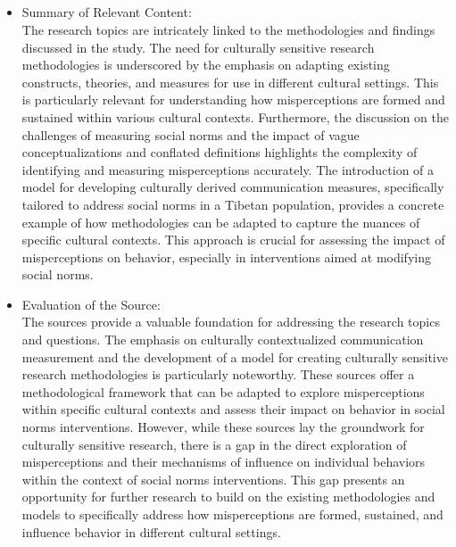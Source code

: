 \documentclass{article}
\begin{document}
\subsection{}
\begin{itemize}
    \item Summary of Relevant Content:\\
The research topics are intricately linked to the methodologies and findings discussed in the study. The need for culturally sensitive research methodologies is underscored by the emphasis on adapting existing constructs, theories, and measures for use in different cultural settings. This is particularly relevant for understanding how misperceptions are formed and sustained within various cultural contexts. Furthermore, the discussion on the challenges of measuring social norms and the impact of vague conceptualizations and conflated definitions highlights the complexity of identifying and measuring misperceptions accurately. The introduction of a model for developing culturally derived communication measures, specifically tailored to address social norms in a Tibetan population, provides a concrete example of how methodologies can be adapted to capture the nuances of specific cultural contexts. This approach is crucial for assessing the impact of misperceptions on behavior, especially in interventions aimed at modifying social norms.
\end{itemize}
\begin{itemize}
    \item Evaluation of the Source:\\
The sources provide a valuable foundation for addressing the research topics and questions. The emphasis on culturally contextualized communication measurement and the development of a model for creating culturally sensitive research methodologies is particularly noteworthy. These sources offer a methodological framework that can be adapted to explore misperceptions within specific cultural contexts and assess their impact on behavior in social norms interventions. However, while these sources lay the groundwork for culturally sensitive research, there is a gap in the direct exploration of misperceptions and their mechanisms of influence on individual behaviors within the context of social norms interventions. This gap presents an opportunity for further research to build on the existing methodologies and models to specifically address how misperceptions are formed, sustained, and influence behavior in different cultural settings.
\end{itemize}
\end{document}
